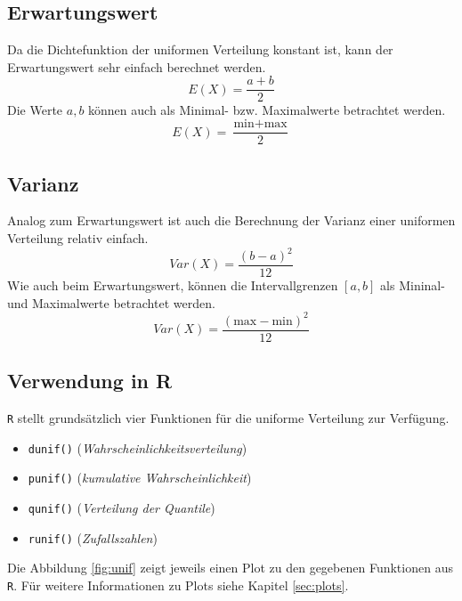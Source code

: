 \subsection{Erwartungswert}
Da die Dichtefunktion der uniformen Verteilung konstant ist,
kann der Erwartungswert sehr einfach berechnet werden.
\[  
	E(X) = \frac{a+b}{2}
\]
Die Werte $a,b$ können auch als Minimal- bzw. Maximalwerte
betrachtet werden.
\[  
E(X) = \frac{\text{min} + \text{max}}{2}
\]

\subsection{Varianz}
Analog zum Erwartungswert ist auch die Berechnung der Varianz
einer uniformen Verteilung relativ einfach.
\[ 
	Var(X) = \frac{(b - a)^2}{12}
\]
Wie auch beim Erwartungswert, können die Intervallgrenzen
$[a,b]$ als Mininal- und Maximalwerte betrachtet werden.
\[  
	Var(X) = \frac{(\text{max} - \text{min})^2}{12}
\]

\subsection{Verwendung in R}
\lstinline{R} stellt grundsätzlich vier Funktionen für die 
uniforme Verteilung zur Verfügung. 
\begin{itemize}
	\item \lstinline{dunif()} \hfill{} 
		(\emph{Wahrscheinlichkeitsverteilung})
	\item \lstinline{punif()} \hfill{}
		(\emph{kumulative Wahrscheinlichkeit})
	\item \lstinline{qunif()} \hfill{}
		(\emph{Verteilung der Quantile})
	\item \lstinline{runif()} \hfill{}
		(\emph{Zufallszahlen})
\end{itemize}
Die Abbildung \ref{fig:unif} zeigt jeweils einen Plot zu den gegebenen
Funktionen aus \lstinline{R}. Für weitere Informationen zu Plots siehe
Kapitel \ref{sec:plots}.





